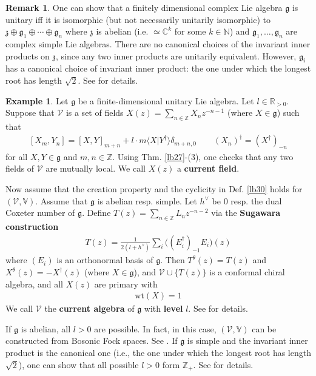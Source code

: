 \documentclass[12pt,b5paper,notitlepage]{article}
\theoremstyle{definition}
\newtheorem{eg}[df]{Example}
\newtheorem{rem}[df]{Remark}
\theoremstyle{plain}
\newcommand{\mc}{\mathcal}
\newcommand{\bk}[1]{\langle {#1}\rangle}
\newcommand{\gk}{\mathfrak g}
\newcommand{\zk}{\mathfrak z}
\newcommand{\Vbb}{\mathbb V}
\newcommand{\Cbb}{\mathbb C}
\newcommand{\Nbb}{\mathbb N}
\newcommand{\Zbb}{\mathbb Z}
\newcommand{\Rbb}{\mathbb R}
\newcommand{\wt}{\mathrm{wt}}
\numberwithin{equation}{section}
\begin{document}
\begin{rem}
One can show that a finitely dimensional complex Lie algebra $\gk$ is unitary iff it is isomorphic (but not necessarily unitarily isomorphic) to $\zk\oplus\gk_1\oplus\cdots\oplus\gk_n$ where $\zk$ is abelian (i.e. $\simeq \Cbb^k$ for some $k\in\Nbb$) and $\gk_1,\dots,\gk_n$ are complex simple Lie algebras. There are no canonical choices of the invariant inner products on $\zk$, since any two inner products are unitarily equivalent. However, $\gk_i$ has a canonical choice of invariant inner product: the one under which the longest root has length $\sqrt 2$. See \cite[Ch. II]{Was-10} for details. 
\end{rem}


\begin{eg}\label{lb41}
Let $\gk$ be a finite-dimensional unitary Lie algebra. Let $l\in\Rbb_{>0}$. Suppose that $\mc V$ is a set of fields $X(z)=\sum_{n\in\Zbb}X_nz^{-n-1}$ (where $X\in\gk$) such that 
\begin{align}\label{eq68}
[X_m,Y_n]=[X,Y]_{m+n}+l\cdot m\bk{X|Y^\dagger}\delta_{m+n,0}\qquad (X_n)^\dagger=(X^\dagger)_{-n}
\end{align}
for all $X,Y\in\gk$ and $m,n\in\Zbb$. Using Thm. \ref{lb27}-(3), one checks that any two fields of $\mc V$ are mutually local. We call $X(z)$ a \textbf{current field}. 


Now assume that the creation property and the cyclicity in Def. \ref{lb30} holds for $(\mc V,\Vbb)$. Assume that $\gk$ is abelian resp. simple. Let $h^\vee$ be $0$ resp. the dual Coxeter number of $\gk$. Define $T(z)=\sum_{n\in\Zbb}L_nz^{-n-2}$ via the \textbf{Sugawara construction}
\begin{align}
T(z)=\frac 1{2(l+h^\vee)}\sum_{i} \big((E_i^\dagger)_{-1}E_i\big)(z)
\end{align}
where $(E_i)$ is an orthonormal basis of $\gk$. Then $T^\theta(z)=T(z)$ and $X^\theta(z)=-X^\dagger(z)$ (where $X\in\gk$), and $\mc V\cup\{T(z)\}$ is a conformal chiral algebra, and all $X(z)$ are primary with
\begin{align*}
\wt(X)=1
\end{align*}
We call $\mc V$ the \textbf{current algebra}  of $\gk$ with \textbf{level}  $l$. See \cite[Sec. 6]{Gui-V} for details.


If $\gk$ is abelian, all $l>0$ are possible. In fact, in this case, $(\mc V,\Vbb)$ can be constructed from Bosonic Fock spaces. See \cite[Subsec. 6.13]{Gui-V}. If $\gk$ is simple and the invariant inner product is the canonical one (i.e., the one under which the longest root has length $\sqrt 2$), one can show that all possible $l>0$ form $\Zbb_+$. See \cite[Ch. III]{Was-10} for details.   \hfill\qedsymbol 
\end{eg}
\end{document}
